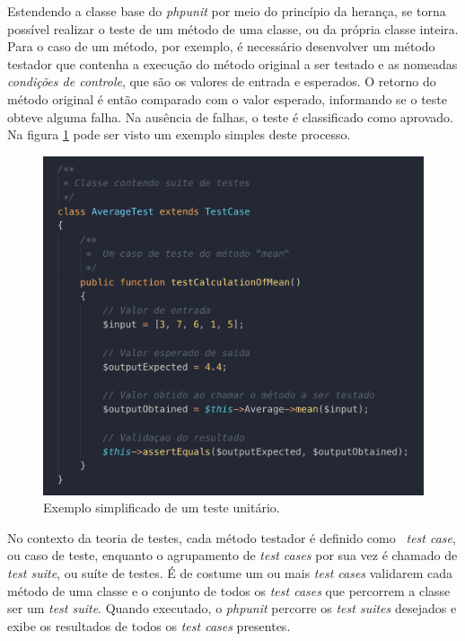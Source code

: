 Estendendo a classe base do \emph{phpunit} por meio do princípio da herança, se torna possível realizar o teste de um método de uma classe, ou da própria classe inteira. Para o caso de um método, por exemplo, é necessário desenvolver um método testador que contenha a execução do método original a ser testado e as nomeadas \emph{condições de controle}, que são os valores de entrada e esperados. O retorno do método original é então comparado com o valor esperado, informando se o teste obteve alguma falha. Na ausência de falhas, o teste é classificado como aprovado. Na figura \ref{fig:phpunit-framework} pode ser visto um exemplo simples deste processo.

\begin{figure}[H]
    \centering
    \includegraphics[width=14cm]{source/4-solucao/images/phpunit-framework.png}
    \caption{Exemplo simplificado de um teste unitário.}
    \label{fig:phpunit-framework}
\end{figure}

No contexto da teoria de testes, cada método testador é definido como \emph{~test case}, ou caso de teste, enquanto o agrupamento de \emph{test cases} por sua vez é chamado de \emph{test suite}, ou suíte de testes. É de costume um ou mais \emph{test cases} validarem cada método de uma classe e o conjunto de todos os \emph{test cases} que percorrem a classe ser um \emph{test suite}. Quando executado, o \emph{phpunit} percorre os \emph{test suites} desejados e exibe os resultados de todos os \emph{test cases} presentes.

